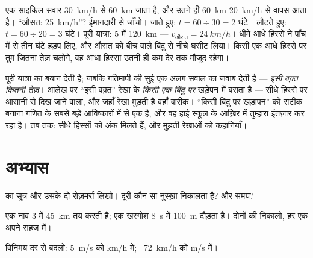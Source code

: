 \begin{example}[फंदा, चलता हुआ]\label{ex:g7:motion-average-speed:sprung}
एक साइकिल सवार \qty{30}{km/h} से \qty{60}{km} जाता है, और उतने ही
\qty{60}{km} \qty{20}{km/h} से वापस आता है। ``औसत: \qty{25}{km/h}''?
ईमानदारी से जाँचो। जाते हुए: $t = 60 \div 30 = 2$ घंटे। लौटते हुए:
$t = 60 \div 20 = 3$ घंटे। पूरी यात्रा: $5$  में \qty{120}{km}
--- $v_{\text{औसत}} = \qty{24}{km/h}$। धीमे आधे हिस्से ने पाँच में से
तीन घंटे हड़प लिए, और औसत को बीच वाले बिंदु से नीचे घसीट लिया। किसी
एक आधे हिस्से पर तुम जितना तेज़ चलोगे, वह आधा हिस्सा उतनी ही कम देर
तक मौजूद रहेगा।
\end{example}

\begin{remark}[गतिमापी क्या जानता है]\label{rem:g7:motion-average-speed:speedometer}
 पूरी यात्रा का बयान देती है; जबकि गतिमापी की सुई एक अलग सवाल
का जवाब देती है --- \emph{इसी वक़्त कितनी तेज़}। आलेख पर ``इसी वक़्त''
रेखा के \emph{किसी एक बिंदु पर} खड़ेपन में बसता है --- सीधे हिस्से पर
आसानी से दिख जाने वाला, और जहाँ रेखा मुड़ती है वहाँ बारीक। ``किसी
बिंदु पर खड़ापन'' को सटीक बनाना गणित के सबसे बड़े आविष्कारों में से एक
है, और वह हाई स्कूल के आख़िर में तुम्हारा इंतज़ार कर रहा है। तब तक:
सीधे हिस्सों को अंक मिलते हैं, और मुड़ती रेखाओं को कहानियाँ।
\end{remark}

\section{अभ्यास}

\begin{exercise}[$\star$]\label{exo:g7:motion-average-speed:1}
 का सूत्र और उसके दो रोज़मर्रा  लिखो। दूरी कौन-सा नुस्ख़ा
निकालता है? और समय?
\end{exercise}

\begin{exercise}[$\star$]\label{exo:g7:motion-average-speed:2}
एक नाव $3$  में \qty{45}{km} तय करती है; एक ख़रगोश \qty{8}{s} में
\qty{100}{m} दौड़ता है। दोनों की  निकालो, हर एक अपने सहज 
में।
\end{exercise}

\begin{exercise}[$\star$]\label{exo:g7:motion-average-speed:3}
विनिमय दर से बदलो: \qty{5}{m/s} को \unit{km/h} में; \
\qty{72}{km/h} को \unit{m/s} में।
\end{exercise}

